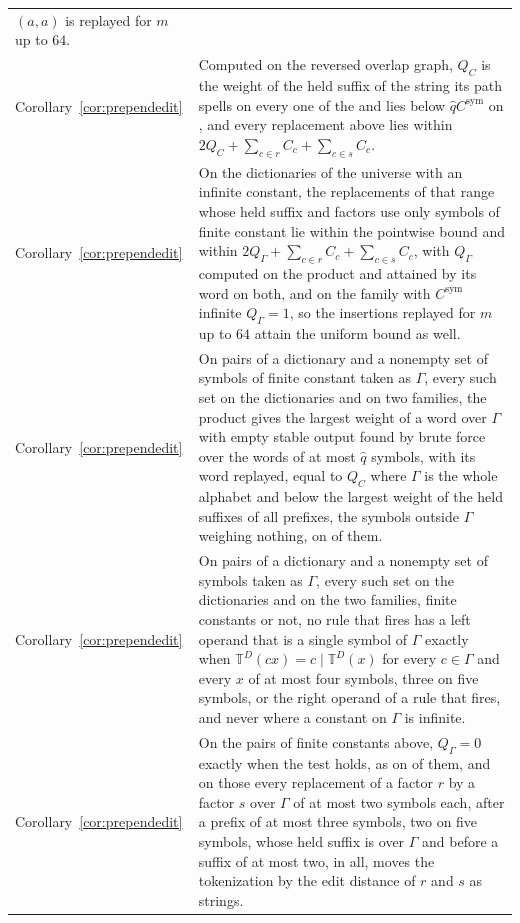 \documentclass[11pt,a4paper]{article}
\theoremstyle{definition}
\theoremstyle{plain}
\newcommand{\T}{\mathbb{T}}
\newcommand{\Csym}{C^{\mathrm{sym}}}
\begin{document}
{\begin{longtable}{@{}>{\raggedright\arraybackslash}p{}>{\raggedright\arraybackslash}p{}@{}}
\((a, a)\)
is replayed for \(m\) up to \(64\). \\
\addlinespace
{\footnotesize Corollary~\ref{cor:prependedit}} & Computed on the reversed overlap graph, \(Q_C\) is the weight of the
held suffix of the string its path spells on every one of the \CapBoth{} and lies below \(\hat{q}\Csym\) on
\CapWeightedBelow{}, and
every replacement above lies within \(2Q_C + \sum_{c \in r} C_c + \sum_{c \in s} C_c\). \\
\addlinespace
{\footnotesize Corollary~\ref{cor:prependedit}} & On the \CapLocalDictionaries{} dictionaries of the universe with an
infinite constant, the \CapLocalEdits{} replacements of that range whose held suffix and factors use only symbols of
finite constant lie within the pointwise bound and within \(2Q_\Gamma + \sum_{c \in r} C_c + \sum_{c \in s} C_c\), with
\(Q_\Gamma\) computed on the product and attained by its word on both, and on the family with \(\Csym\) infinite
\(Q_\Gamma = 1\), so the insertions replayed for \(m\) up to \(64\) attain the uniform bound as well. \\
\addlinespace
{\footnotesize Corollary~\ref{cor:prependedit}} & On \CapGammaPairs{} pairs of a dictionary and a nonempty set of
symbols of finite constant taken as \(\Gamma\), every such set on the \CapDictionaries{} dictionaries and on two
families, the product gives the largest weight of a word over \(\Gamma\) with empty stable output found by brute force
over the words of at most \(\hat{q}\) symbols, with its word replayed, equal to \(Q_C\) where \(\Gamma\) is the whole
alphabet and below the largest weight of the held suffixes of all prefixes, the symbols
outside \(\Gamma\) weighing nothing, on \CapGammaBelow{} of them. \\
\addlinespace
{\footnotesize Corollary~\ref{cor:prependedit}} & On \CapZeroPairs{} pairs of a dictionary and a nonempty set of symbols
taken as \(\Gamma\), every such set on the \CapDictionaries{} dictionaries and on the two families, finite constants or
not, no rule that fires has a left operand that is a single symbol of \(\Gamma\) exactly when
\(\T^D(cx) = c \mid \T^D(x)\) for every \(c \in \Gamma\) and every \(x\) of at most four symbols, three on five symbols,
or the right operand of a rule that fires, and never where a constant on \(\Gamma\) is infinite. \\
\addlinespace
{\footnotesize Corollary~\ref{cor:prependedit}} & On the \CapGammaPairs{} pairs of finite constants above,
\(Q_\Gamma = 0\) exactly when the test holds, as on \CapGammaZero{} of them, and on those every replacement of a factor
\(r\) by a factor \(s\) over \(\Gamma\) of at most two symbols each, after a prefix of at most three symbols, two on
five symbols, whose held suffix is over \(\Gamma\) and before a suffix of at most two, \CapExactEdits{} in all, moves
the
tokenization by the edit distance of \(r\) and \(s\) as strings. \\
\end{longtable}
}



\end{document}

